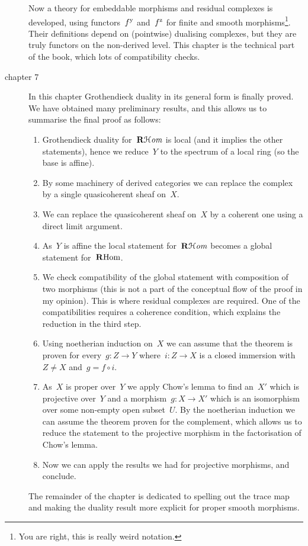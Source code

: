 \begin{description}
    Now a theory for embeddable morphisms and residual complexes is developed, using functors~$f^{\mathrm{y}}$ and~$f^{\mathrm{z}}$ for finite and smooth morphisms\footnote{You are right, this is really weird notation.}. Their definitions depend on (pointwise) dualising complexes, but they are truly functors on the non-derived level. This chapter is the technical part of the book, which lots of compatibility checks.

  \item[chapter 7] In this chapter Grothendieck duality in its general form is finally proved. We have obtained many preliminary results, and this allows us to summarise the final proof \cite[theorem VII.3.3]{hartshorne-residues-and-duality} as follows:
    \begin{enumerate}
      \item Grothendieck duality for~$\operatorname{\mathbf{R}\mathcal{H}\mathit{om}}$ is local (and it implies the other statements), hence we reduce~$Y$ to the spectrum of a local ring (so the base is affine).
      \item By some machinery of derived categories we can replace the complex by a single quasicoherent sheaf on~$X$.
      \item We can replace the quasicoherent sheaf on~$X$ by a coherent one using a direct limit argument.
      \item As~$Y$ is affine the local statement for~$\operatorname{\mathbf{R}\mathcal{H}\mathit{om}}$ becomes a global statement for~$\operatorname{\mathbf{R}Hom}$.
      \item We check compatibility of the global statement with composition of two morphisms (this is not a part of the conceptual flow of the proof in my opinion). This is where residual complexes are required. One of the compatibilities requires a coherence condition, which explains the reduction in the third step.
      \item Using noetherian induction on~$X$ we can assume that the theorem is proven for every~$g\colon Z\to Y$ where~$i\colon Z\to X$ is a closed immersion with~$Z\neq X$ and~$g=f\circ i$.
      \item As~$X$ is proper over~$Y$ we apply Chow's lemma to find an~$X'$ which is projective over~$Y$ and a morphism~$g\colon X\to X'$ which is an isomorphism over some non-empty open subset~$U$. By the noetherian induction we can assume the theorem proven for the complement, which allows us to reduce the statement to the projective morphism in the factorisation of Chow's lemma.
      \item Now we can apply the results we had for projective morphisms, and conclude.
    \end{enumerate}
    The remainder of the chapter is dedicated to spelling out the trace map and making the duality result more explicit for proper smooth morphisms.
\end{description}

